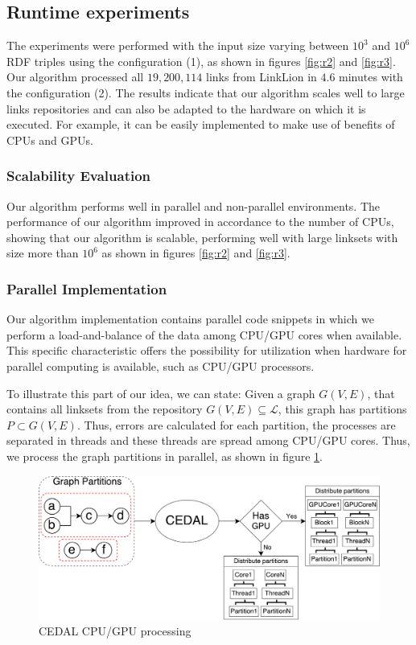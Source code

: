 \subsection{Runtime experiments}

The experiments were performed with the input size varying between $10^3$ and $10^6$ RDF triples using the configuration (1), as shown in figures \ref{fig:r2} and \ref{fig:r3}. Our algorithm processed all $19,200,114$ links from LinkLion in $4.6$ minutes with the configuration (2). 
The results indicate that our algorithm scales well to large links repositories and can also be adapted to the hardware on which it is executed. For example, it can be easily implemented to make use of benefits of CPUs and GPUs.

\subsubsection{Scalability Evaluation}

Our algorithm performs well in parallel and non-parallel environments. The performance of our algorithm improved in accordance to the number of CPUs, showing that our algorithm is scalable, performing well with large linksets with size more than $10^6$ as shown in figures \ref{fig:r2} and \ref{fig:r3}.

\subsubsection{Parallel Implementation}

Our algorithm implementation contains parallel code snippets in which we perform a load-and-balance of the data among CPU/GPU cores when available. This specific characteristic offers the possibility for utilization when hardware for parallel computing is available, such as CPU/GPU processors.


To illustrate this part of our idea, we can state: Given a graph $G(V,E)$, that contains all linksets from the repository $G(V,E) \subseteq \mathcal{L}$, this graph has partitions $P \subset G(V,E)$. Thus, errors are calculated for each partition, the processes are separated in threads and these threads are spread among CPU/GPU cores. Thus, we process the graph partitions in parallel, as shown in figure \ref{fig:cpugpu1}.

\begin{figure}[H]
	\centering
	\includegraphics[width=0.9\linewidth]{img/cpugpu4.pdf}
	\caption{CEDAL CPU/GPU processing}
	\label{fig:cpugpu1}
\end{figure}

